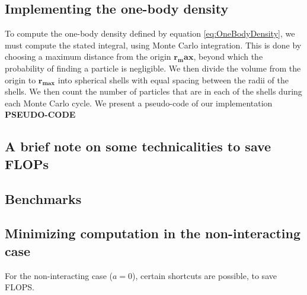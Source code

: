 \documentclass[a4paper, 10pt]{article}
\begin{document}
	\subsection{Implementing the one-body density}\label{sec:MetOneBody}
	To compute the one-body density defined by equation \ref{eq:OneBodyDensity}, we must compute the stated integral, using Monte Carlo integration. This is done by choosing a maximum distance from the origin $\boldsymbol{r_max}$, beyond which the probability of finding a particle is negligible. We then divide the volume from the origin to $\boldsymbol{r_{max}}$ into spherical shells with equal spacing between the radii of the shells. We then count the number of particles that are in each of the shells during each Monte Carlo cycle. We present a pseudo-code of our implementation \textbf{PSEUDO-CODE}
	
	\subsection{A brief note on some technicalities to save FLOPs}
	\subsection{Benchmarks}
	
	
	
	
	
	
	
	
	
	
	
	
	
	
	
	
	
	
	
	
	\subsection{Minimizing computation in the non-interacting case}
	For the non-interacting case ($a=0$), certain shortcuts are possible, to save FLOPS. 
\end{document}
